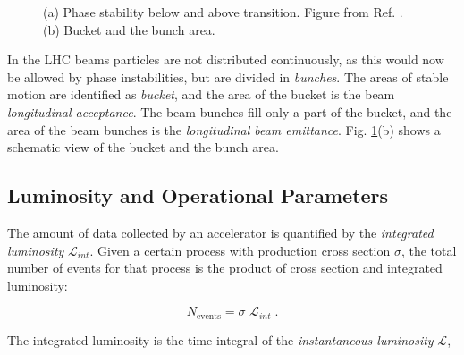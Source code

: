 \begin{figure}[ht]
\centering
{}
\caption{(a) Phase stability below and above transition. Figure from Ref. \cite{Tecker:2016mlq}. (b) Bucket and the bunch area.}
\label{fig:lhc:phase}
\end{figure}


In the LHC beams particles are not distributed continuously, as this would now be allowed by phase instabilities, but are divided in \textit{bunches}. 
The areas of stable motion are identified as \textit{bucket}, and the area of the bucket is the beam \textit{longitudinal acceptance}. The beam bunches fill only a part of the bucket, and the area of the beam bunches is the \textit{longitudinal beam emittance}. Fig. \ref{fig:lhc:phase}(b) shows a schematic view of the bucket and the bunch area.

\subsection{Luminosity and Operational Parameters}

The amount of data collected by an accelerator is quantified by the \textit{integrated luminosity} $\mathcal{L}_{int}$.
Given a certain process with production cross section $\sigma$, the total number of events for that process is the product of cross section and integrated luminosity:

\begin{equation}
\label{eq:cern:nev}
N_{\mathrm{events}} = \sigma \,\, \mathcal{L}_{int} \; .
\end{equation}

The integrated luminosity is the time integral of the \textit{instantaneous luminosity} $\mathcal{L}$, 

